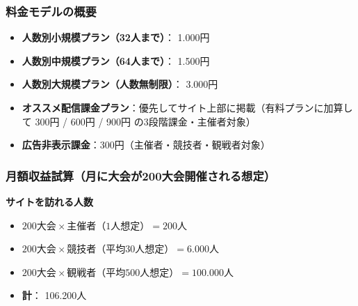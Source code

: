 \subsubsection*{料金モデルの概要}
\begin{itemize}
    \item \textbf{人数別小規模プラン（32人まで）}： \num{1,000}円
    \item \textbf{人数別中規模プラン（64人まで）}： \num{1,500}円
    \item \textbf{人数別大規模プラン（人数無制限）}： \num{3,000}円
    \item \textbf{オススメ配信課金プラン}：優先してサイト上部に掲載（有料プランに加算して \num{300}円 / \num{600}円 / \num{900}円 の3段階課金・主催者対象）
    \item \textbf{広告非表示課金}：\num{300}円（主催者・競技者・観戦者対象）
\end{itemize}

\subsubsection*{月額収益試算（月に大会が200大会開催される想定）}

\textbf{サイトを訪れる人数}
    \begin{itemize}
        \item $\num{200} \text{大会} \times \text{主催者（1人想定）} = \num{200} \text{人}$
        \item $\num{200} \text{大会} \times \text{競技者（平均30人想定）} = \num{6,000} \text{人}$
        \item $\num{200} \text{大会} \times \text{観戦者（平均500人想定）}= \num{100,000} \text{人}$
        \item \textbf{計}： \num{106,200}人
    \end{itemize}

